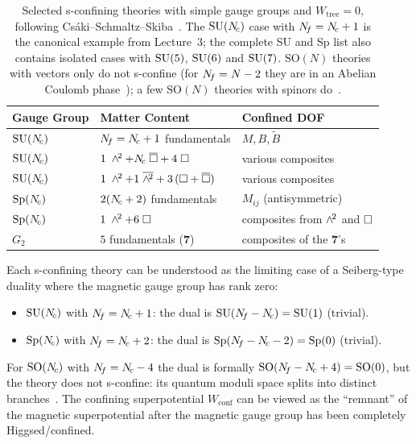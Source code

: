 \documentclass[11pt,a4paper]{article}
\newcommand{\SO}[1]{\mathrm{SO}(#1)}
\newcommand{\Sp}[1]{\mathrm{Sp}(#1)}
\begin{document}
\renewcommand{\arraystretch}{1.3}
\begin{table}[h]
\centering
\begin{tabular}{@{}l l l@{}}
\toprule
\textbf{Gauge Group} & \textbf{Matter Content} & \textbf{Confined DOF} \\
\midrule
$\mathrm{SU}(N_{\!c})$ & $N_{\!f} = N_{\!c} + 1$ fundamentals &
  $M, B, \widetilde{B}$ \\
$\mathrm{SU}(N_{\!c})$ & $1\;\wedge^{\!2} + N_{\!c}\;\overline{\square} + 4\;\square$ &
  various composites \\
$\mathrm{SU}(N_{\!c})$ & $1\;\wedge^{\!2} + 1\;\overline{\wedge^{\!2}} + 3\,(\square + \overline{\square})$ &
  various composites \\
\midrule
$\Sp{\Nc}$ & $2(N_{\!c} + 2)$ fundamentals &
  $M_{ij}$ (antisymmetric) \\
$\Sp{\Nc}$ & $1\;\wedge^{\!2} + 6\;\square$ &
  composites from $\wedge^{\!2}$ and $\square$ \\
\midrule
$G_2$ & $5$ fundamentals ($\mathbf{7}$) &
  composites of the $\mathbf{7}$'s \\
\bottomrule
\end{tabular}
\caption{Selected s-confining theories with simple gauge groups and
$W_{\text{tree}} = 0$, following Cs\'aki--Schmaltz--Skiba~\cite{CSS9610139}.
The $\mathrm{SU}(N_{\!c})$ case with $N_{\!f} = N_{\!c} + 1$ is the canonical example
from Lecture~3; the complete SU and Sp list also contains isolated
cases with $\mathrm{SU}(5)$, $\mathrm{SU}(6)$ and $\mathrm{SU}(7)$.  $\SO{N}$ theories with
vectors only do not s-confine (for $N_{\!f} = N - 2$ they are in an Abelian
Coulomb phase~\cite{IS1995}); a few $\SO{N}$ theories with spinors
do~\cite{CSS9610139}.}
\label{tab:s-confining}
\end{table}

\begin{remark}
Each s-confining theory can be understood as the limiting case of
a Seiberg-type duality where the magnetic gauge group has rank zero:
\begin{itemize}
  \item $\mathrm{SU}(N_{\!c})$ with $N_{\!f} = N_{\!c} + 1$: the dual is
    $\mathrm{SU}(N_{\!f} - N_{\!c}) = \mathrm{SU}(1)$ (trivial).
  \item $\Sp{\Nc}$ with $N_{\!f} = N_{\!c} + 2$: the dual is
    $\Sp{\Nf - \Nc - 2} = \Sp{0}$ (trivial).
\end{itemize}
For $\SO{\Nc}$ with $N_{\!f} = N_{\!c} - 4$ the dual is formally
$\SO{\Nf - \Nc + 4} = \SO{0}$, but the theory does not s-confine: its
quantum moduli space splits into distinct branches~\cite{IS1995}.
The confining superpotential $W_{\text{conf}}$ can be viewed as the
``remnant'' of the magnetic superpotential after the magnetic gauge
group has been completely Higgsed/confined.
\end{remark}
\end{document}
